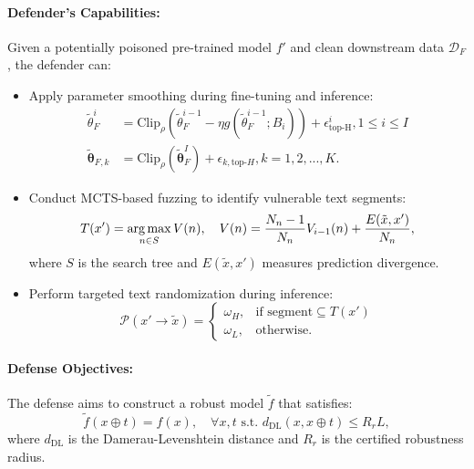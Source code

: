 \paragraph{Defender's Capabilities:}
Given a potentially poisoned pre-trained model $f'$ and clean downstream data $\mathcal{D}_F$, the defender can:
\begin{itemize}[leftmargin=*]
    \item Apply parameter smoothing during fine-tuning and inference:
    \begin{equation}
    \begin{aligned}
        \tilde{\theta}_F^i &= \text{Clip}_\rho(\tilde{\theta}_F^{i-1} - \eta g(\tilde{\theta}_F^{i-1}; B_i)) + \epsilon^i_{\text{top-H}}, 1 \leq i \leq I\\
       \tilde{\mathbf{\theta}}_{F,k} &= \text{Clip}_{\rho}(\tilde{\mathbf{\theta}}^I_F) + \epsilon_{k, \text{top-}H}, k=1,2,...,K.        
    \end{aligned}
   \end{equation}
   \item Conduct MCTS-based fuzzing to identify vulnerable text segments:
   \begin{equation}
       T(x') = \operatorname*{arg\,max}_{n \in S} V(n), \quad V(n) = \frac{N_n - 1}{N_n}V_{i-1}(n) + \frac{E(\tilde{x}, x')}{N_n},
   \end{equation}
   where $S$ is the search tree and $E(\tilde{x}, x')$ measures prediction divergence.
   \item Perform targeted text randomization during inference:
   \begin{equation}
       \mathcal{P}(x' \rightarrow \tilde{x}) = \begin{cases}
           \omega_H, & \text{if segment} \subseteq T(x') \\
           \omega_L, & \text{otherwise}.
       \end{cases}
   \end{equation}
\end{itemize}
\paragraph{Defense Objectives:}
The defense aims to construct a robust model $\tilde{f}$ that satisfies:
\begin{equation}
    \tilde{f}(x \oplus t) = f(x), \quad \forall x, t \text{ s.t. } d_{\text{DL}}(x, x \oplus t) \leq R_r L,
\end{equation}
where $d_{\text{DL}}$ is the Damerau-Levenshtein distance and $R_r$ is the certified robustness radius.


